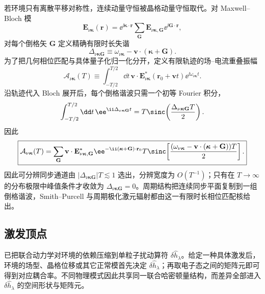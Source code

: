 若环境只有离散平移对称性，连续动量守恒被晶格动量守恒取代。对 Maxwell--Bloch 模
\begin{equation}
\boxed{
\mathbf E_{\nu\boldsymbol\kappa}(\mathbf r)
=\ee^{\ii\boldsymbol\kappa\cdot\mathbf r}
\sum_{\mathbf G}\mathbf E_{\nu\boldsymbol\kappa,\mathbf G}
\ee^{\ii\mathbf G\cdot\mathbf r},}
\label{eq:maxwell_bloch_mode_expansion}
\end{equation}
对每个倒格矢 $\mathbf G$ 定义精确有限时长失谐
\begin{equation*}
 \Delta_{\nu\boldsymbol\kappa\mathbf G}
 \equiv\omega_{\nu\boldsymbol\kappa}-\mathbf v\cdot(\boldsymbol\kappa+\mathbf G).
\end{equation*}
为了把几何相位匹配与具体量子化归一化分开，定义有限轨迹的场--电流重叠振幅
\begin{equation*}
\mathcal A_{\nu\boldsymbol\kappa}(T)
\equiv
\int_{-T/2}^{T/2}\dd t\,
\mathbf v\cdot\mathbf E_{\nu\boldsymbol\kappa}^*(\mathbf r_0+\mathbf vt)
\ee^{\ii\omega_{\nu\boldsymbol\kappa}t}.
\end{equation*}
沿轨迹代入 Bloch 展开后，每个倒格谐波只需一个初等 Fourier 积分，
\begin{equation*}
\int_{-T/2}^{T/2}\dd t\,
\ee^{\ii\Delta_{\nu\boldsymbol\kappa\mathbf G}t}
=T\sinc\!\left(\frac{\Delta_{\nu\boldsymbol\kappa\mathbf G}T}{2}\right).
\end{equation*}
因此
\begin{equation}
\boxed{
\mathcal A_{\nu\boldsymbol\kappa}(T)=
\sum_{\mathbf G}
\mathbf v\cdot\mathbf E_{\nu\boldsymbol\kappa,\mathbf G}^*
\ee^{-\ii(\boldsymbol\kappa+\mathbf G)\cdot\mathbf r_0}
T\sinc\!\left[
\frac{(\omega_{\nu\boldsymbol\kappa}-\mathbf v\cdot(\boldsymbol\kappa+\mathbf G))T}{2}
\right].}
\label{eq:periodic_finite_time_sync_amplitude}
\end{equation}
因此可分辨同步通道由 $|\Delta_{\nu\boldsymbol\kappa\mathbf G}|T\lesssim1$ 选出，分辨宽度为 $O(T^{-1})$；只有在 $T\to\infty$ 的分布极限中峰值条件才收敛为 $\Delta_{\nu\boldsymbol\kappa\mathbf G}=0$。周期结构把连续同步平面复制到一组倒格谐波，Smith--Purcell 与周期极化激元辐射都由这一有限时长相位匹配核给出。

\subsection{激发顶点}

 已把联合动力学对环境的依赖压缩到单粒子扰动算符 $\delta\hat h_\lambda$。给定一种具体激发后，环境的场型、晶格位移或其它正常模首先决定 $\delta\hat h_\lambda$；再取电子态之间的矩阵元即可得到对应耦合率。不同物理模式因此共享同一联合哈密顿量结构，而差异全部进入 $\delta\hat h_\lambda$ 的空间形状与矩阵元。

